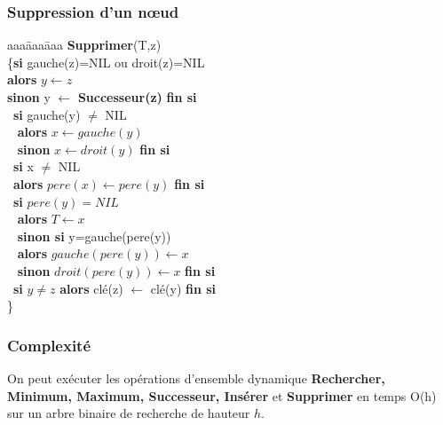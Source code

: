 \begin{frame}\frametitle{Suppression d’un n{\oe}ud}
\begin{tabbing}
   aaa\=aaa\=aaa\kill
 \textbf{Supprimer}(T,z) \\
\{\textbf{si} gauche(z)=NIL ou droit(z)=NIL \\ 
 \> \textbf{alors}  $y \leftarrow z$ \\
 \> \textbf{sinon}  y $\leftarrow$ \textbf{Successeur(z)} \textbf{fin si}\\
\ \textbf{si} gauche(y) $\neq$ NIL \\
\ \> \textbf{alors}  $x \leftarrow gauche(y)$ \\
\ \> \textbf{sinon}  $x \leftarrow droit(y)$ \textbf{fin si}\\
\ \textbf{si} x $\neq$ NIL  \\
\ \>\textbf{alors}  $pere(x) \leftarrow pere(y)$ \textbf{fin si}\\
\ \textbf{si} $pere(y)= NIL$ \\
\ \> \textbf{alors} $T \leftarrow x$ \\
\ \> \textbf{sinon si} y=gauche(pere(y))\\
\ \>\> \textbf{alors}  $gauche(pere(y)) \leftarrow x$ \\
\ \>\> \textbf{sinon}  $droit(pere(y)) \leftarrow x$ \textbf{fin si}\\
\ \textbf{si} $y \neq z$ \textbf{alors} clé(z) $\leftarrow$ clé(y) \textbf{fin si}\\
\}
\end{tabbing}
\end{frame}
\begin{frame}\frametitle{Complexité}
On peut  exécuter les opérations d'ensemble dynamique \textbf{Rechercher, Minimum, Maximum, Successeur, Insérer} et \textbf{Supprimer} en temps O(h) sur un arbre binaire de recherche de hauteur $h$.
\end{frame}


